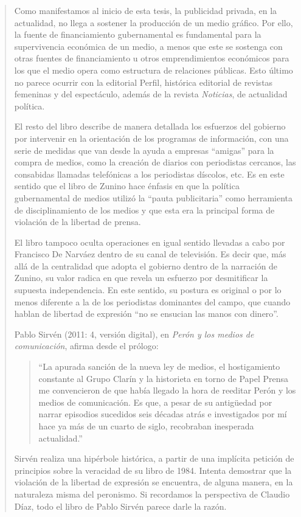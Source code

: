 \begin{quote}
Como manifestamos al inicio de esta tesis, la publicidad privada, en la actualidad, no llega a sostener la producción de un medio gráfico. Por ello, la fuente de financiamiento gubernamental es fundamental para la supervivencia económica de un medio, a menos que este se sostenga con otras fuentes de financiamiento u otros emprendimientos económicos para los que el medio opera como estructura de relaciones públicas. Esto último no parece ocurrir con la editorial Perfil, histórica editorial de revistas femeninas y del espectáculo, además de la revista \emph{Noticias}, de actualidad política.

El resto del libro describe de manera detallada los esfuerzos del gobierno por intervenir en la orientación de los programas de información, con una serie de medidas que van desde la ayuda a empresas ``amigas'' para la compra de medios, como la creación de diarios con periodistas cercanos, las consabidas llamadas telefónicas a los periodistas díscolos, etc. Es en este sentido que el libro de Zunino hace énfasis en que la política gubernamental de medios utilizó la ``pauta publicitaria'' como herramienta de disciplinamiento de los medios y que esta era la principal forma de violación de la libertad de prensa.

El libro tampoco oculta operaciones en igual sentido llevadas a cabo por Francisco De Narváez dentro de su canal de televisión. Es decir que, más allá de la centralidad que adopta el gobierno dentro de la narración de Zunino, su valor radica en que revela un esfuerzo por desmitificar la supuesta independencia. En este sentido, su postura es original o por lo menos diferente a la de los periodistas dominantes del campo, que cuando hablan de libertad de expresión ``no se ensucian las manos con dinero''.

Pablo Sirvén (2011: 4, versión digital), en \emph{Perón y los medios de comunicación}, afirma desde el prólogo:

\begin{quote}
	\enquote{La apurada sanción de la nueva ley de medios, el hostigamiento constante al Grupo Clarín y la historieta en torno de Papel Prensa me convencieron de que había llegado la hora de reeditar Perón y los medios de comunicación. Es que, a pesar de su antigüedad por narrar episodios sucedidos seis décadas atrás e investigados por mí hace ya más de un cuarto de siglo, recobraban inesperada actualidad.}
\end{quote}


Sirvén realiza una hipérbole histórica, a partir de una implícita petición de principios sobre la veracidad de su libro de 1984. Intenta demostrar que la violación de la libertad de expresión se encuentra, de alguna manera, en la naturaleza misma del peronismo. Si recordamos la perspectiva de Claudio Díaz, todo el libro de Pablo Sirvén parece darle la razón.


\end{quote}
